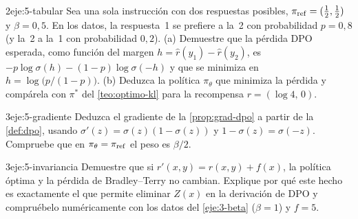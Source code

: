 \begin{ejercicio}{2}{eje:5-tabular}
Sea una sola instrucción con dos respuestas posibles, $\pi_{\mathrm{ref}}=(\tfrac12,\tfrac12)$ y $\beta=0{,}5$. En los datos, la respuesta~1 se prefiere a la~2 con probabilidad $p=0{,}8$ (y la~2 a la~1 con probabilidad $0{,}2$). (a) Demuestre que la pérdida DPO esperada, como función del margen $h=\hat r(y_1)-\hat r(y_2)$, es $-p\log\sigma(h)-(1-p)\log\sigma(-h)$ y que se minimiza en $h=\log\bigl(p/(1-p)\bigr)$. (b) Deduzca la política $\pi_\theta$ que minimiza la pérdida y compárela con $\pi^{*}$ del \cref{teo:optimo-kl} para la recompensa $r=(\log 4,\,0)$.
\end{ejercicio}

\begin{ejercicio}{3}{eje:5-gradiente}
Deduzca el gradiente de la \cref{prop:grad-dpo} a partir de la \cref{def:dpo}, usando $\sigma'(z)=\sigma(z)(1-\sigma(z))$ y $1-\sigma(z)=\sigma(-z)$. Compruebe que en $\pi_\theta=\pi_{\mathrm{ref}}$ el peso es $\beta/2$.
\end{ejercicio}

\begin{ejercicio}{3}{eje:5-invariancia}
Demuestre que si $r'(x,y)=r(x,y)+f(x)$, la política óptima y la pérdida de Bradley--Terry no cambian. Explique por qué este hecho es exactamente el que permite eliminar $Z(x)$ en la derivación de DPO y compruébelo numéricamente con los datos del \cref{eje:3-beta} ($\beta=1$) y $f=5$.
\end{ejercicio}

